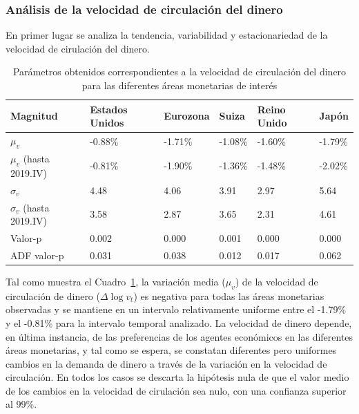 \documentclass[titlepage, 12pt]{article}
\begin{document}
\subsubsection{Análisis de la velocidad de circulación del dinero}

En primer lugar se analiza la tendencia, variabilidad y estacionariedad de la velocidad de cirulación del dinero.

\begin{table}
    \centering
    \begin{tabular}{llllll}
        \toprule
        Magnitud                   & Estados Unidos & Eurozona & Suiza   & Reino Unido & Japón   \\
        \midrule
        $\mu_v$                    & -0.88\%        & -1.71\%  & -1.08\% & -1.60\%     & -1.79\% \\
        $\mu_v$ (hasta 2019.IV)    & -0.81\%        & -1.90\%  & -1.36\% & -1.48\%     & -2.02\% \\
        $\sigma_v$                 & 4.48           & 4.06     & 3.91    & 2.97        & 5.64    \\
        $\sigma_v$ (hasta 2019.IV) & 3.58           & 2.87     & 3.65    & 2.31        & 4.61    \\
        Valor-p                    & 0.002          & 0.000    & 0.001   & 0.000       & 0.000   \\
        ADF valor-p                & 0.031          & 0.038    & 0.012   & 0.017       & 0.062   \\
        \bottomrule
    \end{tabular}
    \caption{Parámetros obtenidos correspondientes a la velocidad de circulación del dinero para las diferentes áreas monetarias de interés}
    \label{tab:v-params}
\end{table}

Tal como muestra el Cuadro~\ref{tab:v-params}, la variación media ($\mu_v$) de la velocidad de circulación de dinero ($\Delta\log v_t$) es negativa para todas las áreas monetarias observadas y se mantiene en un intervalo relativamente uniforme entre el -1.79\% y el -0.81\% para la intervalo temporal analizado. La velocidad de dinero depende, en última instancia, de las preferencias de los agentes económicos en las diferentes áreas monetarias, y tal como se espera, se constatan diferentes pero uniformes cambios en la demanda de dinero a través de la variación en la velocidad de circulación. En todos los casos se descarta la hipótesis nula de que el valor medio de los cambios en la velocidad de cirulación sea nulo, con una confianza superior al 99\%.
\end{document}

